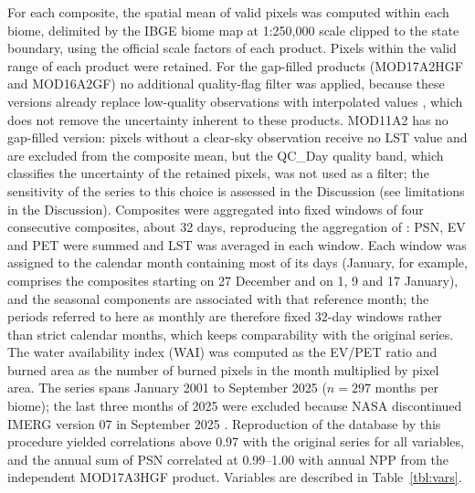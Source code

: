 \documentclass[a4paper,fleqn]{cas-dc}
\begin{document}
For each composite, the spatial mean of valid pixels was computed within each biome, delimited by the IBGE biome map at 1:250,000 scale \citep{ibge2019} clipped to the state boundary, using the official scale factors of each product. Pixels within the valid range of each product were retained. For the gap-filled products (MOD17A2HGF and MOD16A2GF) no additional quality-flag filter was applied, because these versions already replace low-quality observations with interpolated values \citep{running2021gpp}, which does not remove the uncertainty inherent to these products. MOD11A2 has no gap-filled version: pixels without a clear-sky observation receive no LST value and are excluded from the composite mean, but the QC\_Day quality band, which classifies the uncertainty of the retained pixels, was not used as a filter; the sensitivity of the series to this choice is assessed in the Discussion (see limitations in the Discussion). Composites were aggregated into fixed windows of four consecutive composites, about 32 days, reproducing the aggregation of \citet{benfica2022,benfica2023}: PSN, EV and PET were summed and LST was averaged in each window. Each window was assigned to the calendar month containing most of its days (January, for example, comprises the composites starting on 27 December and on 1, 9 and 17 January), and the seasonal components are associated with that reference month; the periods referred to here as monthly are therefore fixed 32-day windows rather than strict calendar months, which keeps comparability with the original series. The water availability index (WAI) was computed as the EV/PET ratio and burned area as the number of burned pixels in the month multiplied by pixel area. The series spans January 2001 to September 2025 ($n = 297$ months per biome); the last three months of 2025 were excluded because NASA discontinued IMERG version 07 in September 2025 \citep{nasa2026}. Reproduction of the \citet{benfica2023} database by this procedure yielded correlations above 0.97 with the original series for all variables, and the annual sum of PSN correlated at 0.99--1.00 with annual NPP from the independent MOD17A3HGF product. Variables are described in Table~\ref{tbl:vars}.
\end{document}

